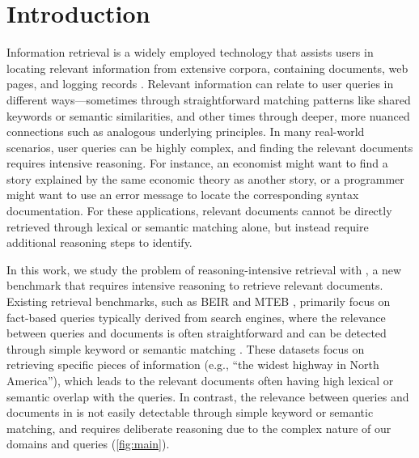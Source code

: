 \section{Introduction}
Information retrieval is a widely employed technology that assists users in locating relevant information from extensive corpora, containing documents, web pages, and logging records \citep{bajaj2016ms,thakur2021beir}.
Relevant information can relate to user queries in different ways---sometimes through straightforward matching patterns like shared keywords or semantic similarities, and other times through deeper, more nuanced connections such as analogous underlying principles.
In many real-world scenarios, user queries can be highly complex, and finding the relevant documents requires intensive reasoning.
For instance, an economist might want to find a story explained by the same economic theory as another story, or a programmer might want to use an error message to locate the corresponding syntax documentation.
For these applications, relevant documents cannot be directly retrieved through lexical or semantic matching alone, but instead require additional reasoning steps to identify.

In this work, we study the problem of reasoning-intensive retrieval with \ours, a new benchmark that requires intensive reasoning to retrieve relevant documents.
Existing retrieval benchmarks, such as BEIR \citep{thakur2021beir} and MTEB \citep{muennighoff2022mteb}, primarily focus on fact-based queries typically derived from search engines, where the relevance between queries and documents is often straightforward and can be detected through simple keyword or semantic matching \citep{lee-etal-2019-latent,karpukhin2020dense}.
These datasets focus on retrieving specific pieces of information (e.g., ``the widest highway in North America''), which leads to the relevant documents often having high lexical or semantic overlap with the queries.
In contrast, the relevance between queries and documents in \ours is not easily detectable through simple keyword or semantic matching, and requires deliberate reasoning due to the complex nature of our domains and queries (\autoref{fig:main}).

